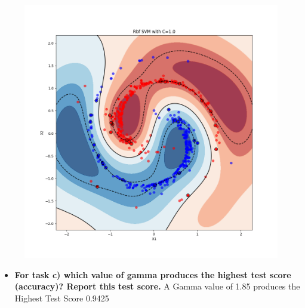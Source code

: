 \documentclass[a4paper]{article}
\begin{document}
\begin{enumerate}[label=(\alph*)]
\begin{figure}[htp]
\begin{minipage}{0.4\textwidth}
  \includegraphics[scale=0.30]{plots/ex2c_2.png}
  \label{fig:13}
\end{minipage}
\end{figure}

\begin{itemize}
\item \textbf{For task c) which value of gamma produces the highest test score (accuracy)? Report this test score.} \newline
A Gamma value of 1.85 produces the Highest Test Score 0.9425


\end{itemize}
\end{enumerate}
\end{document}
